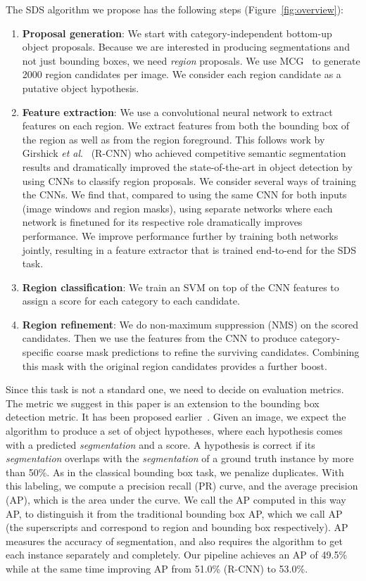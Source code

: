 \documentclass[runningheads]{llncs}
\newcommand\etal{\emph{et al}.\ }
\begin{document}
The SDS algorithm we propose has the following steps (Figure~\ref{fig:overview}):
\begin{enumerate}
\item \textbf{Proposal generation}: We start with category-independent bottom-up object proposals. Because we are interested in producing segmentations and not just bounding boxes, we need \emph{region} proposals.  We use MCG~\cite{ArbelaezCVPR14} to generate 2000 region candidates per image. We consider each region candidate as a putative object hypothesis.
\item \textbf{Feature extraction}: We use a convolutional neural network to extract features on each region. We extract features from both the bounding box of the region as well as from the region foreground. This follows work by Girshick \etal\cite{GirshickCVPR14} (R-CNN) who achieved competitive semantic segmentation results and dramatically improved the state-of-the-art in object detection by using CNNs to classify region proposals. We consider several ways of training the CNNs. We find that, compared to using the same CNN for both inputs (image windows and region masks), using separate networks where each network is finetuned for its respective role dramatically improves performance. We improve performance further by training both networks jointly, resulting in a feature extractor that is trained end-to-end for the SDS task. 
\item \textbf{Region classification}: We train an SVM on top of the CNN features to assign a score for each category to each candidate. 
\item \textbf{Region refinement}: We do non-maximum suppression (NMS) on the scored candidates. Then we use the features from the CNN to produce category-specific coarse mask predictions to refine the surviving candidates. Combining this mask with the original region candidates provides a further boost.
\end{enumerate}

Since this task is not a standard one, we need to decide on evaluation metrics. The metric we suggest in this paper is an extension to the bounding box detection metric.  It has been proposed earlier~\cite{TigheCVPR14,YangTPAMI12}. Given an image, we expect the algorithm to produce a set of object hypotheses, where each hypothesis comes with a predicted \emph{segmentation}  and a score. A hypothesis is correct if its \emph{segmentation} overlaps with the \emph{segmentation} of a ground truth instance by more than 50\%. As in the classical bounding box task, we penalize duplicates. With this labeling, we compute a precision recall (PR) curve, and the average precision (AP), which is the area under the curve. We call the AP computed in this way AP, to distinguish it from the traditional bounding box AP, which we call AP (the superscripts  and  correspond to region and bounding box respectively). AP measures the accuracy of segmentation, and also requires the algorithm to get each instance separately and completely. Our pipeline achieves an AP of 49.5\% while at the same time improving AP from 51.0\% (R-CNN) to 53.0\%. 
\end{document}
